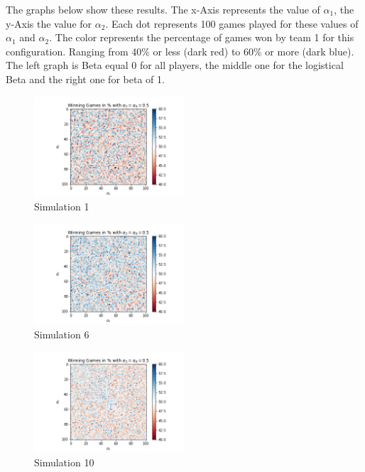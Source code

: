 The graphs below show these results. The x-Axis represents the value of $\alpha_1$, the y-Axis the value for $\alpha_2$. Each dot represents 100 games played for these values of $\alpha_1$ and $\alpha_2$. The color represents the percentage of games won by team 1 for this configuration. Ranging from 40$\%$ or less (dark red) to 60$\%$ or more (dark blue). The left graph is Beta equal 0 for all players, the middle one for the logistical Beta and the right one for beta of 1.

\begin{figure}[!ht]
    \centering
    \includegraphics[width=0.5\textwidth]{Bilder/simulation_2_2}
    \caption{Simulation 1}
    \label{fig:meine-grafik}
    \end{figure}
\begin{figure}[!ht]
    \centering
    \includegraphics[width=0.5\textwidth]{Bilder/simulation_3_2}
    \caption{Simulation 6}
    \label{fig:meine-grafik}
    \end{figure}
\begin{figure}[!ht]
    \centering
    \includegraphics[width=0.5\textwidth]{Bilder/simulation_4_2}
    \caption{Simulation 10}
    \label{fig:meine-grafik}
\end{figure}

